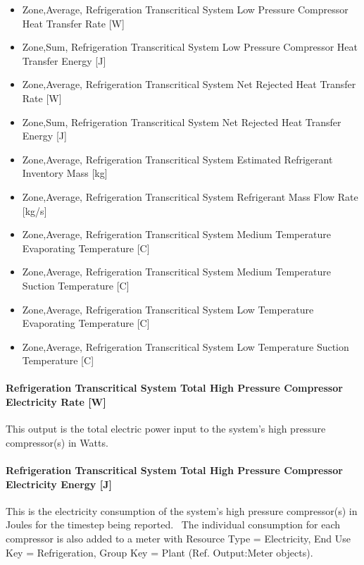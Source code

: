 \begin{itemize}
\item
  Zone,Average, Refrigeration Transcritical System Low Pressure Compressor Heat Transfer Rate {[}W{]}
\item
  Zone,Sum, Refrigeration Transcritical System Low Pressure Compressor Heat Transfer Energy {[}J{]}
\item
  Zone,Average, Refrigeration Transcritical System Net Rejected Heat Transfer Rate {[}W{]}
\item
  Zone,Sum, Refrigeration Transcritical System Net Rejected Heat Transfer Energy {[}J{]}
\item
  Zone,Average, Refrigeration Transcritical System Estimated Refrigerant Inventory Mass {[}kg{]}
\item
  Zone,Average, Refrigeration Transcritical System Refrigerant Mass Flow Rate {[}kg/s{]}
\item
  Zone,Average, Refrigeration Transcritical System Medium Temperature Evaporating Temperature {[}C{]}
\item
  Zone,Average, Refrigeration Transcritical System Medium Temperature Suction Temperature {[}C{]}
\item
  Zone,Average, Refrigeration Transcritical System Low Temperature Evaporating Temperature {[}C{]}
\item
  Zone,Average, Refrigeration Transcritical System Low Temperature Suction Temperature {[}C{]}
\end{itemize}

\paragraph{Refrigeration Transcritical System Total High Pressure Compressor Electricity Rate {[}W{]}}\label{refrigeration-transcritical-system-total-high-pressure-compressor-electric-power-w}

This output is the total electric power input to the system's high pressure compressor(s) in Watts.

\paragraph{Refrigeration Transcritical System Total High Pressure Compressor Electricity Energy {[}J{]}}\label{refrigeration-transcritical-system-total-high-pressure-compressor-electric-energy-j}

This is the electricity consumption of the system's high pressure compressor(s) in Joules for the timestep being reported.~ The individual consumption for each compressor is also added to a meter with Resource Type = Electricity, End Use Key = Refrigeration, Group Key = Plant (Ref. Output:Meter objects).

